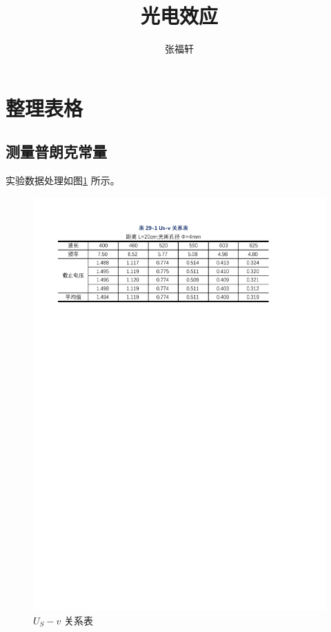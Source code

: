 \documentclass[12pt]{article}
\title{光电效应} %
\author{张福轩}
\begin{document}
\maketitle

\section{\normalfont 整理表格}

\subsection{\normalfont 测量普朗克常量}

实验数据处理如图\ref{fig:table_data1} 所示。

\begin{figure}[H] %
    \centering
    \includegraphics[width=\textwidth]{./figures/表29-1.pdf} 
    \caption{$U_S-v$ 关系表}
    \label{fig:table_data1}
\end{figure}
\end{document}
